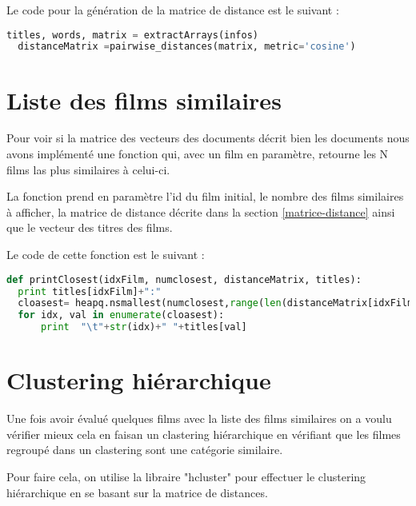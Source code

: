 Le code pour la génération de la matrice de distance est le suivant : \\

\begin{lstlisting}[language=python]
  titles, words, matrix = extractArrays(infos)
  distanceMatrix =pairwise_distances(matrix, metric='cosine')
\end{lstlisting}


\section{Liste des films similaires}

Pour voir si la matrice des vecteurs des documents décrit bien les documents nous avons implémenté une fonction qui, avec un film en paramètre, retourne les N films las plus similaires à celui-ci.

La fonction prend en paramètre l'id du film initial, le nombre des films similaires à afficher, la matrice de distance décrite dans la section \ref{matrice-distance} ainsi que le vecteur des titres des films.

Le code de cette fonction est le suivant : \\

\begin{lstlisting}[language=python]
def printClosest(idxFilm, numclosest, distanceMatrix, titles):
  print titles[idxFilm]+":"
  cloasest= heapq.nsmallest(numclosest,range(len(distanceMatrix[idxFilm])),distanceMatrix[idxFilm].take)
  for idx, val in enumerate(cloasest):
      print  "\t"+str(idx)+" "+titles[val]
\end{lstlisting}


\section{Clustering hiérarchique}

Une fois avoir évalué quelques films avec la liste des films similaires on a voulu vérifier mieux cela en faisan un clastering hiérarchique en vérifiant que les filmes regroupé dans un clastering sont une catégorie similaire.

Pour faire cela, on utilise la libraire "hcluster" pour effectuer le clustering hiérarchique en se basant sur la matrice de distances.

